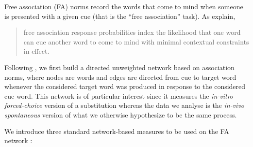 Free association (FA) norms record the words that come to mind when someone is presented with a given cue (that is the ``free association'' task).
As \citeauthor{Nelson04} explain,
\begin{quote}
free association response probabilities index the likelihood that one word can cue another word to come to mind with minimal contextual constraints in effect.~\citep{Nelson04}
\end{quote}
Following \citet{Griffiths07}, we first build a directed unweighted network based on association norms, where nodes are words and edges are directed from cue to target word whenever the considered target word was produced in response to the considered cue word.
This network is of particular interest since it measures the \emph{in-vitro forced-choice} version of a substitution whereas the data we analyse is the \emph{in-vivo spontaneous} version of what we otherwise hypothesize to be the same process.

\bigskip
We introduce three standard network-based measures to be used on the FA network%
:

